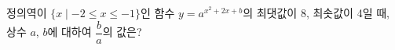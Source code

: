 정의역이 $\{x \mid -2 \le x \le -1\}$인 함수 $y=a^{x^{2}+2x+b}$의 최댓값이 8, 최솟값이 4일 때, 상수 $a$, $b$에 대하여 $\dfrac{b}{a}$의 값은? 
